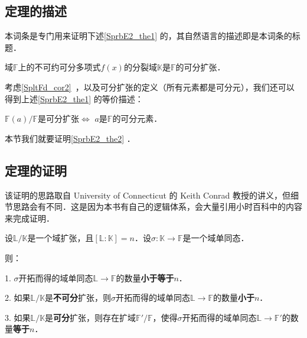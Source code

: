 

\subsection{定理的描述}

本词条是专门用来证明下述\autoref{SprbE2_the1} 的，其自然语言的描述即是本词条的标题．

\begin{theorem}{}\label{SprbE2_the1}
域$\mathbb{F}$上的不可约可分多项式$f(x)$的分裂域$\mathbb{K}$是$\mathbb{F}$的可分扩张．
\end{theorem}

考虑\autoref{SpltFd_cor2}~，以及可分扩张的定义（所有元素都是可分元），我们还可以得到上述\autoref{SprbE2_the1} 的等价描述：

\begin{theorem}{}\label{SprbE2_the2}
$\mathbb{F}(a)/\mathbb{F}$是可分扩张$\iff$ $a$是$\mathbb{F}$的可分元素．
\end{theorem}

本节我们就要证明\autoref{SprbE2_the2} ．



\subsection{定理的证明}
该证明的思路取自 University of Connecticut 的 Keith Conrad 教授的讲义，但细节思路会有不同．这是因为本书有自己的逻辑体系，会大量引用小时百科中的内容来完成证明．

\begin{lemma}{}\label{SprbE2_lem1}
设$\mathbb{L}/\mathbb{K}$是一个域扩张，且$[\mathbb{L}:\mathbb{K}]=n$．设$\sigma:\mathbb{K}\to\mathbb{F}$是一个域单同态．

则：

1. $\sigma$开拓而得的域单同态$\mathbb{L}\to\mathbb{F}$的数量\textbf{小于等于}$n$．

2. 如果$\mathbb{L}/\mathbb{K}$是\textbf{不可分}扩张，则$\sigma$开拓而得的域单同态$\mathbb{L}\to\mathbb{F}$的数量\textbf{小于}$n$．

3. 如果$\mathbb{L}/\mathbb{K}$是\textbf{可分}扩张，则存在扩域$\mathbb{F}'/\mathbb{F}$，使得$\sigma$开拓而得的域单同态$\mathbb{L}\to\mathbb{F}'$的数量\textbf{等于}$n$．

\end{lemma}


